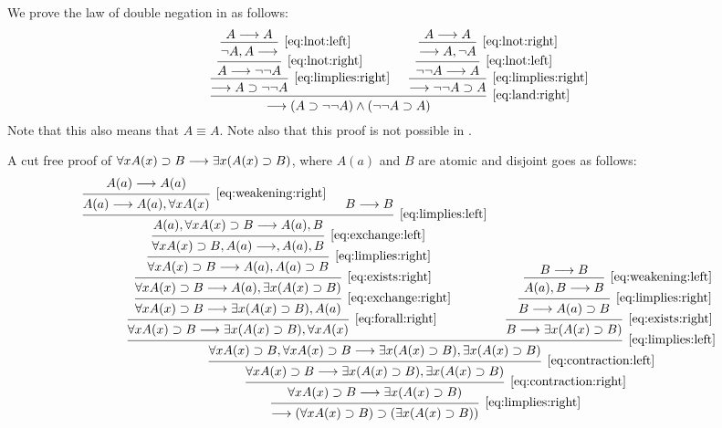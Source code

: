 \documentclass[11pt,a4paper]{article}
\begin{document}
\begin{example}\label{exa:double negation in LK}
    We prove the law of double negation in \LK{} as follows:
\begin{equation*}
    \begin{prooftree}
        \hypo{A\seq A}
        \infer1[\eqref{eq:lnot:left}]{\lnot A, A\seq}
        \infer1[\eqref{eq:lnot:right}]{A\seq\lnot\lnot A}
        \infer1[\eqref{eq:limplies:right}]{\seq A\limplies\lnot\lnot A}
        \hypo{A\seq A}
        \infer1[\eqref{eq:lnot:right}]{\seq A, \lnot A}
        \infer1[\eqref{eq:lnot:left}]{\lnot\lnot A\seq A}
        \infer1[\eqref{eq:limplies:right}]{\seq\lnot\lnot A\limplies A}
        \infer2[\eqref{eq:land:right}]{\seq\arcs{A\limplies\lnot\lnot A}\land\arcs{\lnot\lnot A\limplies A}}
    \end{prooftree}
\end{equation*}
    Note that this also means that \(A\equiv A\).
    Note also that this proof is not possible in \LJ.
\end{example}

\begin{example}\label{exa:cut free proof}
    A cut free proof of \(\forall x A(x)\supset B \longrightarrow \exists x (A(x)\supset B)\),
    where \(A(a)\) and \(B\) are atomic and disjoint goes as follows:
    \begin{equation*}
        \begin{prooftree}
            \hypo{A(a)\seq A(a)}
            \infer1[\eqref{eq:weakening:right}]{A(a)\seq A(a), \forall x A(x)}
            \hypo{B\seq B}
            \infer2[\eqref{eq:limplies:left}]{A(a), \forall xA(x)\limplies B\seq A(a), B}
            \infer1[\eqref{eq:exchange:left}]{\forall xA(x)\limplies B, A(a)\seq, A(a), B}
            \infer1[\eqref{eq:limplies:right}]{\forall xA(x)\limplies B\seq A(a), A(a)\limplies B}
            \infer1[\eqref{eq:exists:right}]{\forall xA(x)\limplies B\seq A(a), \exists x\arcs{A(x)\limplies B}}
            \infer1[\eqref{eq:exchange:right}]{\forall xA(x)\limplies B\seq\exists x\arcs{A(x)\limplies B}, A(a)}
            \infer1[\eqref{eq:forall:right}]{\forall xA(x)\limplies B\seq\exists x\arcs{A(x)\limplies B}, \forall x A(x)}
            \hypo{B\seq B}
            \infer1[\eqref{eq:weakening:left}]{A(a), B\seq B}
            \infer1[\eqref{eq:limplies:right}]{B\seq A(a)\limplies B}
            \infer1[\eqref{eq:exists:right}]{B\seq\exists x\arcs{A(x)\limplies B}}
            \infer2[\eqref{eq:limplies:left}]{\forall x A(x)\limplies B, \forall x A(x)\limplies B \seq \exists x \arcs{A(x)\limplies B}, \exists x \arcs{A(x)\limplies B}}
            \infer1[\eqref{eq:contraction:left}]{\forall x A(x)\limplies B \seq \exists x \arcs{A(x)\limplies B}, \exists x \arcs{A(x)\limplies B}}
            \infer1[\eqref{eq:contraction:right}]{\forall x A(x)\limplies B \seq \exists x \arcs{A(x)\limplies B}}
            \infer1[\eqref{eq:limplies:right}]{\seq\arcs{\forall x A(x)\limplies B}\limplies\arcs{\exists x \arcs{A(x)\limplies B}}}
        \end{prooftree}
    \end{equation*}
\end{example}
\end{document}
